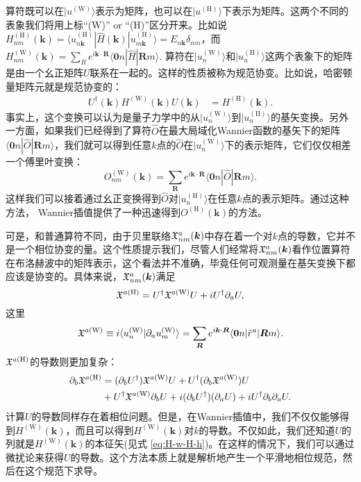算符既可以在$|u^{(\textrm{W})}\rangle$表示为矩阵，也可以在$|u^{(\textrm{H})}\rangle$下表示为矩阵。这两个不同的表象我们将用上标``(W)'' or ``(H)''区分开来。比如说$H_{nm}^{(\textrm{H})}(\mathbf{k})=\langle u_{n\mathbf{k}}^{(\textrm{H})}|\hat{H}(\mathbf{k})|u_{m\mathbf{k}}^{(\textrm{H})}\rangle=E_{n\mathbf{k}}\delta_{nm}$，而 $H_{nm}^{(\textrm{W})}(\mathbf{k})=\sum_{R}e^{i\mathbf{k}\cdot\mathbf{R}}\langle\mathbf{0}n|\hat{H}|\mathbf{R}m\rangle$. 算符在$|u_{n}^{(\textrm{W})}\rangle$和$|u_{n}^{(\textrm{H})}\rangle$这两个表象下的矩阵是由一个幺正矩阵$U$联系在一起的。这样的性质被称为规范协变\cite{wang_textitab_2006}。比如说，哈密顿量矩阵元就是规范协变的：
\begin{align}
U^{\dagger}(\mathbf{k})H^{(\textrm{W})}(\mathbf{k})U(\mathbf{k}) & =H^{(\textrm{H})}(\mathbf{k}).\label{eq:H-w-H-h}
\end{align}
事实上，这个变换可以认为是量子力学中的从$|u_{n}^{(\textrm{W})}\rangle$到$|u_{n}^{(\textrm{H})}\rangle$的基矢变换。另外一方面，如果我们已经得到了算符$\hat{O}$在最大局域化Wannier函数的基矢下的矩阵$\langle\mathbf{0}n|\hat{O}|\mathbf{R}m\rangle$，我们就可以得到任意$k$点的$\hat{O}$在$|u_{n}^{(\textrm{W})}\rangle$下的表示矩阵，它们仅仅相差一个傅里叶变换：
\[
O_{nm}^{(\textrm{W})}(\mathbf{k})=\sum_{\mathbf{R}}e^{i\mathbf{k}\cdot\mathbf{R}}\langle\mathbf{0}n|\hat{O}|\mathbf{R}m\rangle.
\]
这样我们可以接着通过幺正变换得到$\hat{O}$对$|u_{n}^{(\textrm{H})}\rangle$在任意$k$点的表示矩阵。通过这种方法， Wannier插值提供了一种迅速得到$O^{(\textrm{H})}(\mathbf{k})$的方法。

可是，和普通算符不同，由于贝里联络$\mathfrak{X}_{nm}^{a}(\boldsymbol{k})$中存在着一个对$k$点的导数，它并不是一个相位协变的量。这个性质提示我们，尽管人们经常将$\mathfrak{X}_{nm}^{a}(\boldsymbol{k})$看作位置算符在布洛赫波中的矩阵表示，这个看法并不准确，毕竟任何可观测量在基矢变换下都应该是协变的。具体来说，$\mathfrak{X}_{nm}^{a}(\boldsymbol{k})$满足\cite{wang_textitab_2006} 
\begin{equation}
	\mathfrak{X}^{a(\textrm{H})}=U^{\dagger}\mathfrak{X}^{a(\textrm{W})}U+iU^{\dagger}\partial_{a}U,\label{eq:A-H-A-W}
\end{equation}
这里
\begin{equation}
	\mathfrak{X}^{a(\textrm{W})}\equiv i\langle u_{n}^{(\textrm{W})}|\partial_{a}u_{m}^{(\textrm{W})}\rangle=\sum_{\boldsymbol{R}}e^{i\boldsymbol{k}\cdot\boldsymbol{R}}\langle\boldsymbol{0}n|\hat{r}^{a}|\boldsymbol{R}m\rangle.
\end{equation}
$\mathfrak{X}^{a(\textrm{H})}$的导数则更加复杂：
\begin{align}
\partial_{b}\mathfrak{X}^{a(\textrm{H})} & =(\partial_{b}U^{\dagger})\mathfrak{X}^{a(\textrm{W})}U+U^{\dagger}(\partial_{b}\mathfrak{X}^{a(\textrm{W})})U\\
& +U^{\dagger}\mathfrak{X}^{a(\textrm{W})}\partial_{b}U+i(\partial_{b}U^{\dagger})(\partial_{a}U)+iU^{\dagger}\partial_{b}\partial_{a}U.
\end{align}
计算$U$的导数同样存在着相位问题。但是，在Wannier插值中，我们不仅仅能够得到$H^{(\textrm{W})}(\mathbf{k})$，而且可以得到$H^{(\textrm{W})}(\mathbf{k})$对$k$的导数。不仅如此，我们还知道$U$的列就是$H^{(\textrm{W})}(\mathbf{k})$的本征矢(见式 \ref{eq:H-w-H-h})。在这样的情况下，我们可以通过微扰论来获得$U$的导数。这个方法本质上就是解析地产生一个平滑地相位规范，然后在这个规范下求导。

